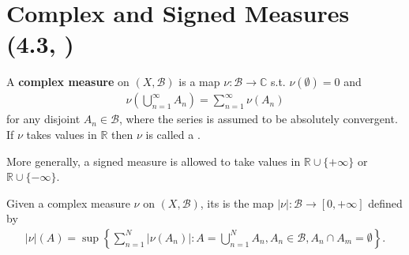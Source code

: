 \section{Complex and Signed Measures \tiny{(4.3, \cite{Gerald_Teschl})}}
\begin{definition}
    A \textbf{complex measure} on \(\left(X,\mathscr{B}\right)\) is a map \(\nu:\mathscr{B}\rightarrow \mathbb{C}\) s.t. 
    \(\nu(\emptyset)=0\) and
    \begin{align*}
        \nu\left(\bigcup\limits_{n=1}^{\infty}A_n\right) = \sum\limits_{n=1}^{\infty}\nu(A_n)
    \end{align*}
    for any disjoint \(A_n\in\mathscr{B}\), where the series is assumed to be absolutely convergent. If \(\nu\) takes values in \(\mathbb{R}\) then \(\nu\) is called a .
\end{definition}
\begin{remark}
    More generally, a signed measure is allowed to take values in \(\mathbb{R}\cup\{+\infty\}\) or \(\mathbb{R}\cup\{-\infty\}\).
\end{remark}

    Given a complex measure \(\nu\) on \((X,\mathscr{B})\), its  is the map \(|\nu|:\mathscr{B}\rightarrow[0,+\infty]\) defined by
    \begin{align*}
        |\nu|(A) = \sup\left\{\sum\limits_{n=1}^{N}|\nu(A_n)|:A=\bigcup\limits_{n=1}^{N}A_n, A_n\in\mathscr{B}, A_n\cap A_m = \emptyset\right\}.
    \end{align*}

